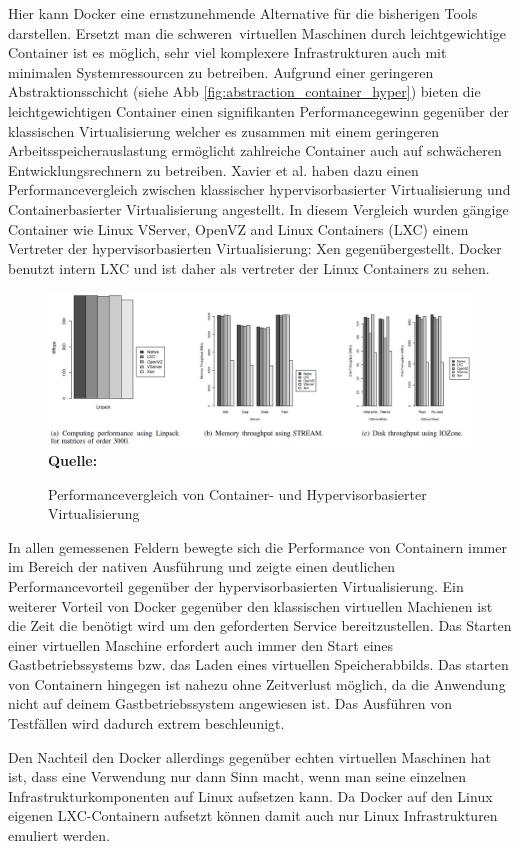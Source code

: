 Hier kann Docker eine ernstzunehmende Alternative für die bisherigen Tools darstellen. Ersetzt man die \grq schweren\grq\ virtuellen Maschinen durch leichtgewichtige Container ist es möglich, sehr viel komplexere Infrastrukturen auch mit minimalen Systemressourcen zu betreiben.
Aufgrund einer geringeren Abstraktionsschicht (siehe Abb \ref{fig:abstraction_container_hyper}) bieten die leichtgewichtigen Container einen signifikanten Performancegewinn gegenüber der klassischen Virtualisierung welcher es zusammen mit einem geringeren Arbeitsspeicherauslastung ermöglicht zahlreiche Container auch auf schwächeren Entwicklungsrechnern zu betreiben.
Xavier et al. \cite{miguel_g._xavier_performance_????} haben dazu einen Performancevergleich zwischen klassischer hypervisorbasierter Virtualisierung und Containerbasierter Virtualisierung angestellt.
In diesem Vergleich wurden gängige Container  wie Linux VServer, OpenVZ and Linux Containers (LXC) einem Vertreter der hypervisorbasierten Virtualisierung: Xen gegenübergestellt.
Docker benutzt intern LXC und ist daher als vertreter der Linux Containers zu sehen.
\begin{figure}[htbp]
  \centering  
  \includegraphics[scale=0.5]{img/performanceBenchmarks.JPG}\\
  \footnotesize\sffamily\textbf{Quelle:} \cite{miguel_g._xavier_performance_????}
  \caption{Performancevergleich von Container- und Hypervisorbasierter Virtualisierung}
  \label{fig:performance_container_hyper}
\end{figure}
In allen gemessenen Feldern bewegte sich die Performance von Containern immer im Bereich der nativen Ausführung und zeigte einen deutlichen Performancevorteil gegenüber der hypervisorbasierten Virtualisierung. 
Ein weiterer Vorteil von Docker gegenüber den klassischen virtuellen Machienen ist die Zeit die benötigt wird um den geforderten Service bereitzustellen. Das Starten einer virtuellen Maschine erfordert auch immer den Start eines Gastbetriebssystems bzw. das Laden eines virtuellen Speicherabbilds. Das starten von Containern hingegen ist nahezu ohne Zeitverlust möglich, da die Anwendung nicht auf deinem Gastbetriebssystem angewiesen ist.
Das Ausführen von Testfällen wird dadurch extrem beschleunigt.


Den Nachteil den Docker allerdings gegenüber echten virtuellen Maschinen hat ist, dass eine Verwendung nur dann Sinn macht, wenn man seine einzelnen Infrastrukturkomponenten auf Linux aufsetzen kann. Da Docker auf den Linux eigenen LXC-Containern aufsetzt können damit auch nur Linux Infrastrukturen emuliert werden.
